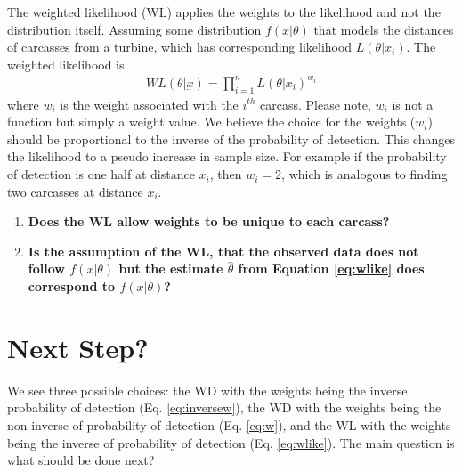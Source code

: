 \documentclass{westarticle}
\begin{document}
The weighted likelihood (WL) applies the weights to the likelihood and not
the distribution itself. Assuming some distribution $f(x|\theta)$ that
models the distances of carcasses from a turbine, which has
corresponding likelihood $L(\theta|x_i)$.
The weighted likelihood is
\begin{align}
  \label{eq:wlike}
  WL(\theta|\underbar{x}) = \prod_{i=1}^{n}L(\theta|x_i)^{w_i}
\end{align}
where $w_i$ is the weight associated with the $i^{th}$ carcass. Please
note, $w_i$ is not a function but simply a weight value. 
We believe the choice for the weights ($w_i$) should be proportional
to the inverse of the probability of detection. 
This changes the likelihood to a pseudo
increase in sample size. For example if the probability of detection
is one half at distance $x_i$, then $w_i=2$, which is analogous to finding two carcasses
at distance $x_i$.

\begin{enumerate}[label=\bf{Q\arabic*:},resume]
\item \bf{Does the WL allow weights to be unique to each carcass?}

\item \bf{Is the assumption of the WL, that the observed data does not follow
$f(x|\theta)$ but the estimate $\hat\theta$ from Equation
\ref{eq:wlike} does correspond to $f(x|\theta)$?}

\end{enumerate}

\section{Next Step?}

We see three possible choices: the WD with the weights being the inverse probability of
detection (Eq. \ref{eq:inversew}), the WD with the weights being the non-inverse of
probability of detection (Eq. \ref{eq:w}), and the
WL with the weights being the inverse of probability of detection (Eq. \ref{eq:wlike}). The main question is
what should be done next?
\end{document}
